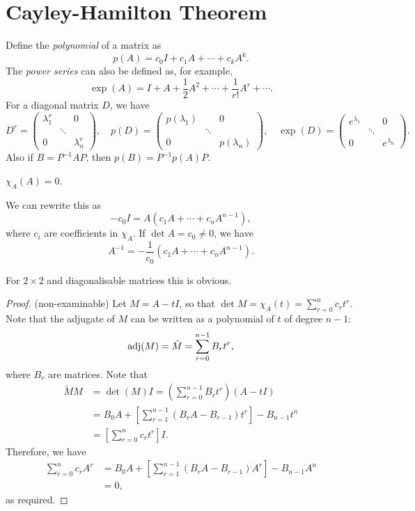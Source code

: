 \documentclass[10pt]{article}
\begin{document}
    \section{Cayley-Hamilton Theorem}
    Define the \textit{polynomial} of a matrix as 
    \[
        p(A)=c_0I+c_1A+\cdots + c_kA^k.
    \]
    The \textit{power series} can also be defined as, for example,
    \[
        \exp(A)=I+A+\frac{1}{2}A^2+ \cdots +\frac{1}{r!}A^r+ \cdots .
    \]
    For a diagonal matrix $D$, we have 
    \[
        D^r = \begin{pmatrix}
            \lambda_1^r&&0\\
            & \ddots &\\
            0&&\lambda_n^r
        \end{pmatrix},\quad p(D)=\begin{pmatrix}
            p(\lambda_1)&&0\\
            & \ddots &\\
            0&&p(\lambda_n)
        \end{pmatrix}, \quad \exp(D)=\begin{pmatrix}
            e^{\lambda_1}&&0\\
            & \ddots &\\
            0&&e^{\lambda_n}
        \end{pmatrix}.
    \]
    Also if $ B=P^{-1}AP $, then $ p(B)=P^{-1}p(A)P $.
    \begin{theorem}\label{thm:Cayley-Hamilton}
        $ \chi_A(A)=0 $.
    \end{theorem}
    \begin{remark}
        We can rewrite this as 
        \[
            -c_0I = A(c_1A+ \cdots +c_nA^{n-1}),
        \]
        where $c_i$ are coefficients in $\chi_A$. If $ \det A=c_0\neq 0 $, we have 
        \[
            A^{-1}=-\frac{1}{c_0}(c_1A+ \cdots +c_nA^{n-1}).
        \]
    \end{remark}
    For $ 2 \times 2 $ and diagonalisable matrices this is obvious.
    \begin{proof}(non-examinable)
        Let $ M=A-tI $, so that $ \det M=\chi_A(t)=\sum_{r=0}^{n}c_rt^r $. Note that the adjugate of $M$ can be written as a polynomial of $t$ of degree $n-1$:
        \[
            \operatorname{adj}(M)=\tilde{M}=\sum_{r=0}^{n-1}B_r t^r,
        \]
        where $B_r$ are matrices. Note that
        \begin{align*}
            \tilde{M}M&=\det (M)I = \left( \sum_{r=0}^{n-1}B_r t^r \right)\left( A-tI \right)\\
            &=B_0A+ \left[\sum_{r=1}^{n-1}(B_{r}A-B_{r-1})t^r\right] -B_{n-1}t^n\\
            &= \left[ \sum_{r=0}^{n}c_rt^r  \right]I.
        \end{align*}
        Therefore, we have 
        \begin{align*}
            \sum_{r=0}^{n}c_r A^r&= B_0A+ \left[\sum_{r=1}^{n-1}(B_{r}A-B_{r-1})A^r\right] -B_{n-1}A^n\\
            &= 0,
        \end{align*}
        as required.
    \end{proof}
\end{document}
